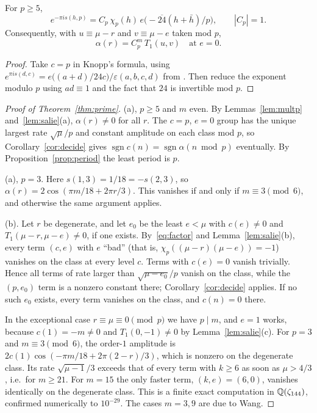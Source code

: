 \documentclass[11pt]{amsart}
\theoremstyle{definition}\newtheorem{definition}[theorem]{Definition}
\theoremstyle{remark}\newtheorem{remark}[theorem]{Remark}
\newcommand{\sgn}{\operatorname{sgn}}\newcommand{\lcm}{\operatorname{lcm}}
\begin{document}
\begin{lemma}[multiplier at $c=p$]\label{lem:multp}
For $p\ge5$,
\[
e^{-\pi is(h,p)}=C_p\,\chi_p(h)\,e\big(-\overline{24}(h+\bar h)/p\big),\qquad |C_p|=1 .
\]
Consequently, with $u\equiv\mu-r$ and $v\equiv\mu-e$ taken mod $p$,
\[
\alpha(r)=C_p^m\,T_1(u,v)\quad\text{at } e=0 .
\]
\end{lemma}
\begin{proof}
Take $c=p$ in Knopp's formula, using $e^{\pi is(d,c)}=e\big((a+d)/24c\big)/\varepsilon(a,b,c,d)$ from \cite[Thm.~3.4]{Ap}. Then reduce the exponent modulo $p$ using $ad\equiv1$ and the fact that $24$ is invertible mod $p$.
\end{proof}

\begin{proof}[Proof of Theorem~\ref{thm:prime}]
(a), $p\ge5$ and $m$ even. By Lemmas~\ref{lem:multp} and~\ref{lem:salie}(a), $\alpha(r)\ne0$ for all $r$. The $c=p$, $e=0$ group has the unique largest rate $\sqrt\mu/p$ and constant amplitude on each class mod $p$, so Corollary~\ref{cor:decide} gives $\sgn c(n)=\sgn\alpha(n\bmod p)$ eventually. By Proposition~\ref{prop:period} the least period is $p$.

(a), $p=3$. Here $s(1,3)=1/18=-s(2,3)$, so $\alpha(r)=2\cos(\pi m/18+2\pi r/3)$. This vanishes if and only if $m\equiv3\pmod6$, and otherwise the same argument applies.

(b). Let $r$ be degenerate, and let $e_0$ be the least $e<\mu$ with $c(e)\ne0$ and $T_1(\mu-r,\mu-e)\ne0$, if one exists. By~\eqref{eq:factor} and Lemma~\ref{lem:salie}(b), every term $(c,e)$ with $e$ ``bad'' (that is, $\chi_p((\mu-r)(\mu-e))=-1$) vanishes on the class at every level $c$. Terms with $c(e)=0$ vanish trivially. Hence all terms of rate larger than $\sqrt{\mu-e_0}/p$ vanish on the class, while the $(p,e_0)$ term is a nonzero constant there; Corollary~\ref{cor:decide} applies. If no such $e_0$ exists, every term vanishes on the class, and $c(n)=0$ there.

In the exceptional case $r\equiv\mu\equiv0\pmod p$ we have $p\mid m$, and $e=1$ works, because $c(1)=-m\ne0$ and $T_1(0,-1)\ne0$ by Lemma~\ref{lem:salie}(c). For $p=3$ and $m\equiv3\pmod6$, the order-$1$ amplitude is $2c(1)\cos(-\pi m/18+2\pi(2-r)/3)$, which is nonzero on the degenerate class. Its rate $\sqrt{\mu-1}/3$ exceeds that of every term with $k\ge6$ as soon as $\mu>4/3$, i.e.\ for $m\ge21$. For $m=15$ the only faster term, $(k,e)=(6,0)$, vanishes identically on the degenerate class. This is a finite exact computation in $\mathbb Q(\zeta_{144})$, confirmed numerically to $10^{-29}$. The cases $m=3,9$ are due to Wang.
\end{proof}
\end{document}
